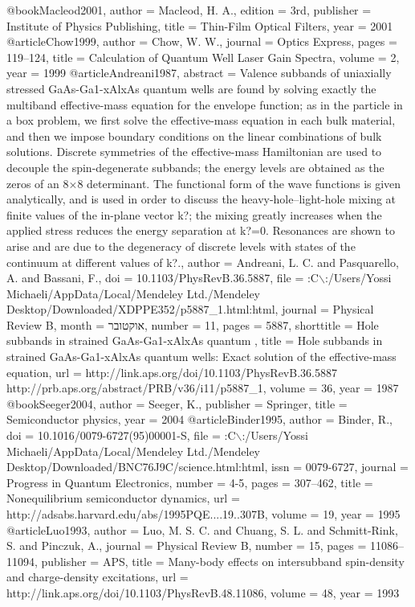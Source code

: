 @book{Macleod2001,
author = {Macleod, H. A.},
edition = {3rd},
publisher = {Institute of Physics Publishing},
title = {{Thin-Film Optical Filters}},
year = {2001}
}
@article{Chow1999,
author = {Chow, W. W.},
journal = {Optics Express},
pages = {119--124},
title = {{Calculation of Quantum Well Laser Gain Spectra}},
volume = {2},
year = {1999}
}
@article{Andreani1987,
abstract = {Valence subbands of uniaxially stressed GaAs-Ga1-xAlxAs quantum wells are found by solving exactly the multiband effective-mass equation for the envelope function; as in the particle in a box problem, we first solve the effective-mass equation in each bulk material, and then we impose boundary conditions on the linear combinations of bulk solutions. Discrete symmetries of the effective-mass Hamiltonian are used to decouple the spin-degenerate subbands; the energy levels are obtained as the zeros of an 8×8 determinant. The functional form of the wave functions is given analytically, and is used in order to discuss the heavy-hole–light-hole mixing at finite values of the in-plane vector k?; the mixing greatly increases when the applied stress reduces the energy separation at k?=0. Resonances are shown to arise and are due to the degeneracy of discrete levels with states of the continuum at different values of k?.},
author = {Andreani, L. C. and Pasquarello, A. and Bassani, F.},
doi = {10.1103/PhysRevB.36.5887},
file = {:C$\backslash$:/Users/Yossi Michaeli/AppData/Local/Mendeley Ltd./Mendeley Desktop/Downloaded/XDPPE352/p5887\_1.html:html},
journal = {Physical Review B},
month = {אוקטובר},
number = {11},
pages = {5887},
shorttitle = {Hole subbands in strained GaAs-Ga1-xAlxAs quantum },
title = {{Hole subbands in strained GaAs-Ga1-xAlxAs quantum wells: Exact solution of the effective-mass equation}},
url = {http://link.aps.org/doi/10.1103/PhysRevB.36.5887 http://prb.aps.org/abstract/PRB/v36/i11/p5887\_1},
volume = {36},
year = {1987}
}
@book{Seeger2004,
author = {Seeger, K.},
publisher = {Springer},
title = {{Semiconductor physics}},
year = {2004}
}
@article{Binder1995,
author = {Binder, R.},
doi = {10.1016/0079-6727(95)00001-S},
file = {:C$\backslash$:/Users/Yossi Michaeli/AppData/Local/Mendeley Ltd./Mendeley Desktop/Downloaded/BNC76J9C/science.html:html},
issn = {0079-6727},
journal = {Progress in Quantum Electronics},
number = {4-5},
pages = {307--462},
title = {{Nonequilibrium semiconductor dynamics}},
url = {http://adsabs.harvard.edu/abs/1995PQE....19..307B},
volume = {19},
year = {1995}
}
@article{Luo1993,
author = {Luo, M. S. C. and Chuang, S. L. and Schmitt-Rink, S. and Pinczuk, A.},
journal = {Physical Review B},
number = {15},
pages = {11086--11094},
publisher = {APS},
title = {{Many-body effects on intersubband spin-density and charge-density excitations}},
url = {http://link.aps.org/doi/10.1103/PhysRevB.48.11086},
volume = {48},
year = {1993}
}
